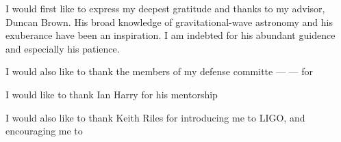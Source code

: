 
\noindent I would first like to express my deepest gratitude and thanks to my advisor,
Duncan Brown. His broad knowledge of gravitational-wave astronomy and his
exuberance have been an inspiration. I am indebted for his abundant guidence and
especially his patience.

\noindent I would also like to thank the members of my defense committe --- 
--- for 

\noindent I would like to thank Ian Harry for his mentorship

\noindent I would also like to thank Keith Riles for introducing me to LIGO,
and encouraging me to 
 
